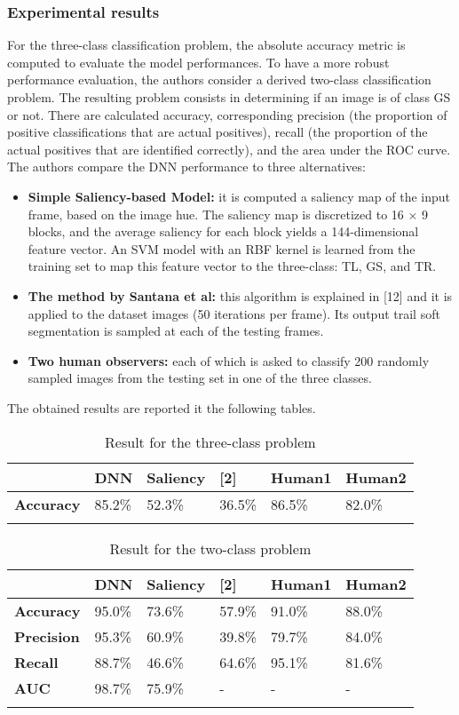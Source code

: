 \subsubsection{Experimental results}\label{header-n72}

For the three-class classification problem, the absolute accuracy metric
is computed to evaluate the model performances. To have a more robust
performance evaluation, the authors consider a derived two-class
classification problem. The resulting problem consists in determining if
an image is of class GS or not. There are calculated accuracy,
corresponding precision (the proportion of positive classifications that
are actual positives), recall (the proportion of the actual positives
that are identified correctly), and the area under the ROC curve. The
authors compare the DNN performance to three alternatives:

\begin{itemize}
\item
  \textbf{Simple Saliency-based Model:} it is computed a saliency map of
  the input frame, based on the image hue. The saliency map is
  discretized to 16 × 9 blocks, and the average saliency for each block
  yields a 144-dimensional feature vector. An SVM model with an RBF
  kernel is learned from the training set to map this feature vector to
  the three-class: TL, GS, and TR.
\item
  \textbf{The method by Santana et al:} this algorithm is explained in
  {[}12{]} and it is applied to the dataset images (50 iterations per
  frame). Its output trail soft segmentation is sampled at each of the
  testing frames.
\item
  \textbf{Two human observers:} each of which is asked to classify 200
  randomly sampled images from the testing set in one of the three
  classes.
\end{itemize}

The obtained results are reported it the following tables.

\begin{longtable}[]{@{}llllll@{}}

\toprule
& \textbf{DNN} & \textbf{Saliency} & \textbf{{[}2{]}} & \textbf{Human1}
& \textbf{Human2}\tabularnewline
\midrule
\endhead
\textbf{Accuracy} & 85.2\% & 52.3\% & 36.5\% & 86.5\% &
82.0\%\tabularnewline
\bottomrule
\caption{Result for the three-class problem}
\end{longtable}

\begin{longtable}[]{@{}llllll@{}}
\toprule
& \textbf{DNN} & \textbf{Saliency} & \textbf{{[}2{]}} & \textbf{Human1}
& \textbf{Human2}\tabularnewline
\midrule
\endhead
\textbf{Accuracy} & 95.0\% & 73.6\% & 57.9\% & 91.0\% &
88.0\%\tabularnewline
\textbf{Precision} & 95.3\% & 60.9\% & 39.8\% & 79.7\% &
84.0\%\tabularnewline
\textbf{Recall} & 88.7\% & 46.6\% & 64.6\% & 95.1\% &
81.6\%\tabularnewline
\textbf{AUC} & 98.7\% & 75.9\% & - & - & -\tabularnewline
\bottomrule
\caption{Result for the two-class problem}
\end{longtable}

